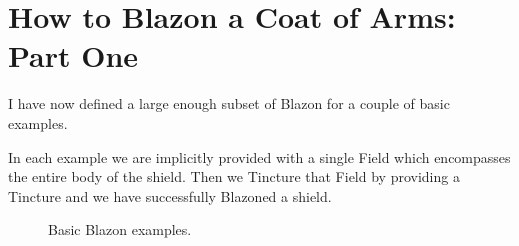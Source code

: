 \section{How to Blazon a Coat of Arms: Part One}

I have now defined a large enough subset of Blazon for a couple of basic examples.  

In each example we are implicitly provided with a single Field which encompasses the entire body of the shield. Then we Tincture that Field by providing a Tincture and we have successfully Blazoned a shield.  

\begin{figure}[H]
\hfill
{}
\hfill
{}
\hfill
{}
\hfill
\caption{Basic Blazon examples.}
\end{figure}

